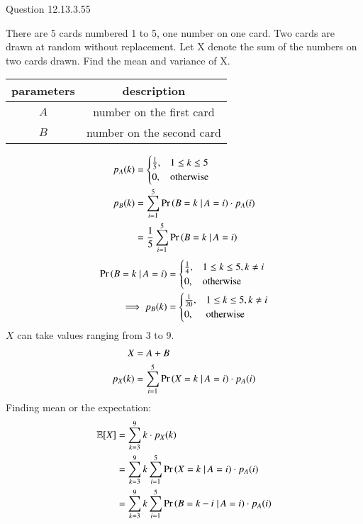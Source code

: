 \documentclass[journal,12pt,twocolumn]{IEEEtran}
\theoremstyle{remark}
\newcommand{\E}{\mathbb{E}}
\begin{document}
Question 12.13.3.55

There are 5 cards numbered 1 to 5, one number on one card. Two cards are drawn at random without replacement. Let X denote the sum of the numbers on two cards drawn. Find the mean and variance of X.

\solution
\begin{table}[!ht]
\begin{tabular}{|c|c|}
	\hline
	\textbf{parameters} & \textbf{description}\\
	\hline
	$A$ & number on the first card \\
	\hline
	$B$ & number on the second card \\
	\hline
\end{tabular}
\end{table}
\begin{align}
p_A(k) &= 
	\begin{cases}
		\frac{1}{5}, & 1 \leq k \leq 5 \\
		0, & \text{otherwise}
	\end{cases}\\
p_B(k) &= \sum_{i=1}^5\Pr\left(B=k\left.\right |A=i\right)\cdot p_A(i)\\
&= \frac{1}{5}\sum_{i=1}^5\Pr\left(B=k\left.\right |A=i\right)
\end{align}
\begin{align}
	\Pr\left(B=k\left.\right |A=i\right) &= 
	\begin{cases}
		\frac{1}{4}, & 1 \leq k \leq 5,k\neq i\\
		0, & \text{otherwise}
	\end{cases}\\
	\implies p_B(k) &=
	\begin{cases}
		\frac{1}{20}, & 1 \leq k \leq 5,k\neq i\\
		0, & \text{otherwise}
	\end{cases}
\end{align}
$X$ can take values ranging from 3 to 9.
\begin{align}
	X &= A+B\\
	p_X(k) &= \sum_{i=1}^5\Pr\left(X=k\left. \right |A=i\right)\cdot p_A(i)
\end{align}
Finding mean or the expectation:
\begin{align}
	\E[X] &= \sum_{k=3}^9k\cdot p_X(k)\\
	&= \sum_{k=3}^9k\sum_{i=1}^5\pr{X=k\left. \right |A=i}\cdot p_A(i)\\
	&= \sum_{k=3}^9k\sum_{i=1}^5\pr{B=k-i\left.\right |A=i}\cdot p_A(i)
\end{align}
\end{document}
